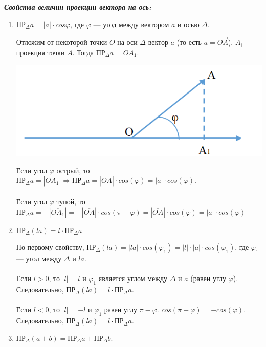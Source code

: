 \textbf{\textit{Свойства величин проекции вектора на ось:}}\begin{enumerate}
	\item $\text{ПР}_\Delta a = |a|\cdot cos\varphi$, где $\varphi$ --- угод между вектором $a$ и осью $\Delta$.
	\begin{Proof}
		Отложим от некоторой точки $O$ на оси $\Delta$ вектор $a$ (то есть $a = \overrightarrow{OA}$). $A_1$ --- проекция точки $A$. Тогда $\text{ПР}_\Delta a = OA_1$.\begin{center}
			\includegraphics[scale=0.5]{images/corn2_3.png}
		\end{center}
		Если угол $\varphi$ острый, то $\text{ПР}_\Delta a = |\overline{OA_1}|\Rightarrow \text{ПР}_\Delta a = |\overline{OA}|\cdot cos(\varphi) = |a|\cdot cos(\varphi)$.\\\\
		Если угол $\varphi$ тупой, то $\text{ПР}_\Delta a = -|\overline{OA_1}| = -|\overline{OA}|\cdot cos(\pi - \varphi) = |\overline{OA}|\cdot cos(\varphi) = |a|\cdot cos(\varphi)$
	\end{Proof}
	\item $\text{ПР}_\Delta (la) = l\cdot \text{ПР}_\Delta a$\begin{Proof}
		По первому свойству, $\text{ПР}_\Delta (la) = |la|\cdot cos(\varphi_1) = |l| \cdot |a| \cdot cos(\varphi_1)$, где $\varphi_1$ --- угол между $\Delta$ и $la$.\\\\
		Если $l > 0$, то $|l| = l$ и $\varphi_1$ является углом между $\Delta$ и $a$ (равен углу $\varphi$). Следовательно, $\text{ПР}_\Delta (la) = l\cdot \text{ПР}_\Delta a$.\\\\
		Если $l < 0$, то $|l| = -l$ и $\varphi_1$ равен углу $\pi - \varphi$. $cos(\pi-\varphi) = -cos(\varphi)$. Следовательно, $\text{ПР}_\Delta (la) = l\cdot \text{ПР}_\Delta a$.
	\end{Proof}
	\item $\text{ПР}_\Delta (a+b) = \text{ПР}_\Delta a + \text{ПР}_\Delta b$.

\end{enumerate}
